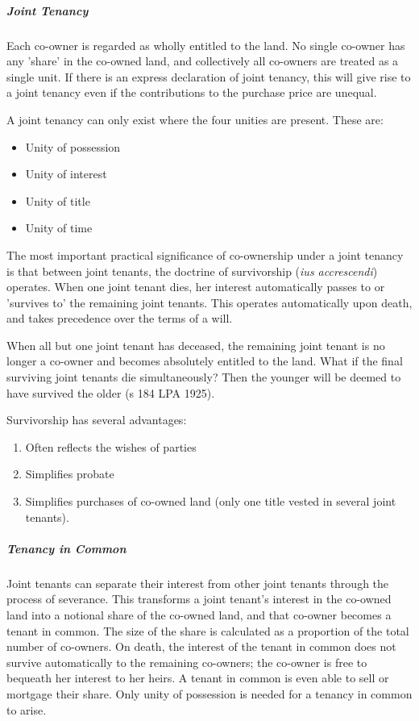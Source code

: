 \documentclass[
]{article}
\providecommand{\tightlist}{%
  \setlength{\itemsep}{0pt}\setlength{\parskip}{0pt}}
\begin{document}
\hypertarget{joint-tenancy-1}{%
\subparagraph{Joint Tenancy}\label{joint-tenancy-1}}

Each co-owner is regarded as wholly entitled to the land. No single
co-owner has any 'share' in the co-owned land, and collectively all
co-owners are treated as a single unit. If there is an express
declaration of joint tenancy, this will give rise to a joint tenancy
even if the contributions to the purchase price are unequal.

A joint tenancy can only exist where the four unities are present. These
are:

\begin{itemize}
\tightlist
\item
  Unity of possession
\item
  Unity of interest
\item
  Unity of title
\item
  Unity of time
\end{itemize}

The most important practical significance of co-ownership under a joint
tenancy is that between joint tenants, the doctrine of survivorship
(\emph{ius accrescendi}) operates. When one joint tenant dies, her
interest automatically passes to or 'survives to' the remaining joint
tenants. This operates automatically upon death, and takes precedence
over the terms of a will.

When all but one joint tenant has deceased, the remaining joint tenant
is no longer a co-owner and becomes absolutely entitled to the land.
What if the final surviving joint tenants die simultaneously? Then the
younger will be deemed to have survived the older (s 184 LPA 1925).

Survivorship has several advantages:

\begin{enumerate}
\tightlist
\item
  Often reflects the wishes of parties
\item
  Simplifies probate
\item
  Simplifies purchases of co-owned land (only one title vested in
  several joint tenants).
\end{enumerate}

\hypertarget{tenancy-in-common-1}{%
\subparagraph{Tenancy in Common}\label{tenancy-in-common-1}}

Joint tenants can separate their interest from other joint tenants
through the process of severance. This transforms a joint tenant's
interest in the co-owned land into a notional share of the co-owned
land, and that co-owner becomes a tenant in common. The size of the
share is calculated as a proportion of the total number of co-owners. On
death, the interest of the tenant in common does not survive
automatically to the remaining co-owners; the co-owner is free to
bequeath her interest to her heirs. A tenant in common is even able to
sell or mortgage their share. Only unity of possession is needed for a
tenancy in common to arise.
\end{document}
